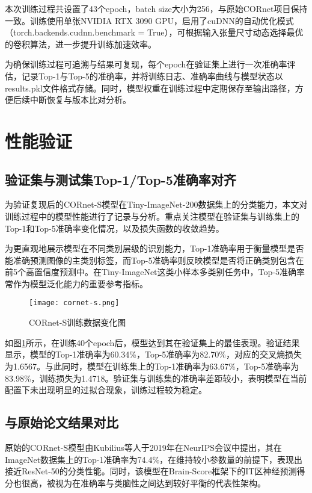 本次训练过程共设置了43个epoch，batch size大小为256，与原始CORnet项目保持一致。训练使用单张NVIDIA RTX 3090 GPU，启用了cuDNN的自动优化模式（torch.backends.cudnn.benchmark = True），可根据输入张量尺寸动态选择最优的卷积算法，进一步提升训练加速效率\cite{paszke2019pytorch}。

为确保训练过程可追溯与结果可复现，每个epoch在验证集上进行一次准确率评估，记录Top-1与Top-5的准确率，并将训练日志、准确率曲线与模型状态以results.pkl文件格式存储。同时，模型权重在训练过程中定期保存至输出路径，方便后续中断恢复与版本比对分析。


\section{性能验证}

\subsection{验证集与测试集Top-1/Top-5准确率对齐}

为验证复现后的CORnet-S模型在Tiny-ImageNet-200数据集上的分类能力，本文对训练过程中的模型性能进行了记录与分析。重点关注模型在验证集与训练集上的Top-1和Top-5准确率变化情况，以及损失函数的收敛趋势。

为更直观地展示模型在不同类别层级的识别能力，Top-1准确率用于衡量模型是否能准确预测图像的主类别标签，而Top-5准确率则反映模型是否将正确类别包含在前5个高置信度预测中。在Tiny-ImageNet这类小样本多类别任务中，Top-5准确率常作为模型泛化能力的重要参考指标。

\begin{figure}[hbt]
	\centering
	\texttt{[image: cornet-s.png]}
	\caption{CORnet-S训练数据变化图}
	\label{f.szxt}
\end{figure}

如图\ref{f.szxt}所示，在训练40个epoch后，模型达到其在验证集上的最佳表现。验证结果显示，模型的Top-1准确率为60.34\%，Top-5准确率为82.70\%，对应的交叉熵损失为1.6567。与此同时，模型在训练集上的Top-1准确率为63.67\%，Top-5准确率为83.98\%，训练损失为1.4718。验证集与训练集的准确率差距较小，表明模型在当前配置下未出现明显的过拟合现象，训练过程较为稳定。

\subsection{与原始论文结果对比}

原始的CORnet-S模型由Kubilius等人于2019年在NeurIPS会议中提出，其在ImageNet数据集上的Top-1准确率为74.4\%\cite{kubilius2019brain}，在维持较小参数量的前提下，表现出接近ResNet-50的分类性能。同时，该模型在Brain-Score框架下的IT区神经预测得分也很高，被视为在准确率与类脑性之间达到较好平衡的代表性架构。

